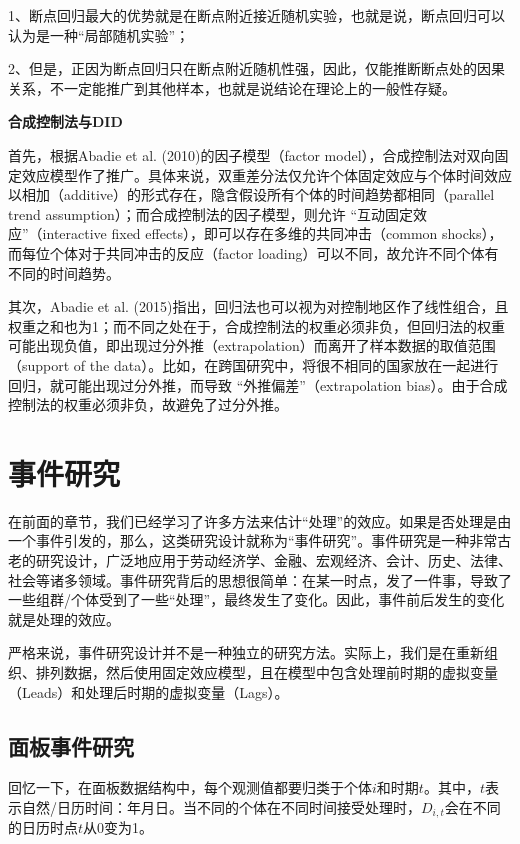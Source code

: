 \documentclass[cn,12pt,math=newtx,citestyle=gb7714-2015,bibstyle=gb7714-2015]{elegantbook}
\begin{document}
	1、断点回归最大的优势就是在断点附近接近随机实验，也就是说，断点回归可以认为是一种“局部随机实验”；
	
	2、但是，正因为断点回归只在断点附近随机性强，因此，仅能推断断点处的因果关系，不一定能推广到其他样本，也就是说结论在理论上的一般性存疑。
	
	
	\textbf{合成控制法与DID}
	
	首先，根据Abadie et al. (2010)的因子模型（factor model），合成控制法对双向固定效应模型作了推广。具体来说，双重差分法仅允许个体固定效应与个体时间效应以相加（additive）的形式存在，隐含假设所有个体的时间趋势都相同（parallel trend assumption）；而合成控制法的因子模型，则允许 “互动固定效应”（interactive fixed effects），即可以存在多维的共同冲击（common shocks），而每位个体对于共同冲击的反应（factor loading）可以不同，故允许不同个体有不同的时间趋势。
	
	其次，Abadie et al. (2015)指出，回归法也可以视为对控制地区作了线性组合，且权重之和也为1；而不同之处在于，合成控制法的权重必须非负，但回归法的权重可能出现负值，即出现过分外推（extrapolation）而离开了样本数据的取值范围（support of the data）。比如，在跨国研究中，将很不相同的国家放在一起进行回归，就可能出现过分外推，而导致 “外推偏差”（extrapolation bias）。由于合成控制法的权重必须非负，故避免了过分外推。
	
	\chapter{事件研究}
	
	在前面的章节，我们已经学习了许多方法来估计“处理”的效应。如果是否处理是由一个事件引发的，那么，这类研究设计就称为“事件研究”。事件研究是一种非常古老的研究设计，广泛地应用于劳动经济学、金融、宏观经济、会计、历史、法律、社会等诸多领域。事件研究背后的思想很简单：在某一时点，发了一件事，导致了一些组群/个体受到了一些“处理”，最终发生了变化。因此，事件前后发生的变化就是处理的效应。
	
	严格来说，事件研究设计并不是一种独立的研究方法。实际上，我们是在重新组织、排列数据，然后使用固定效应模型，且在模型中包含处理前时期的虚拟变量（Leads）和处理后时期的虚拟变量（Lags）。
	
	\section{面板事件研究}
	
	回忆一下，在面板数据结构中，每个观测值都要归类于个体$i$和时期$t$。其中，$t$表示自然/日历时间：年月日。当不同的个体在不同时间接受处理时，$D_{i,t}$会在不同的日历时点$t$从0变为1。
	
\end{document}
